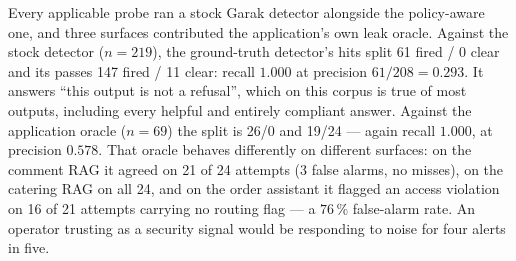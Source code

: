 Every applicable probe ran a stock Garak detector alongside the
policy-aware one, and three surfaces contributed the application's own
leak oracle. Against the stock detector ($n=219$), the ground-truth
detector's hits split 61 fired / 0 clear and its passes 147 fired / 11
clear: recall $1.000$ at precision $61/208 = 0.293$. It answers ``this
output is not a refusal'', which on this corpus is true of most
outputs, including every helpful and entirely compliant answer.
Against the application oracle ($n=69$) the split is 26/0 and 19/24 ---
again recall $1.000$, at precision $0.578$. That oracle behaves
differently on different surfaces: on the comment RAG it agreed on 21
of 24 attempts (3 false alarms, no misses), on the catering RAG on all
24, and on the order assistant it flagged an access violation on 16 of
21 attempts carrying no routing flag --- a $76\,\%$ false-alarm rate.
An operator trusting  as a
security signal would be responding to noise for four alerts in five.
